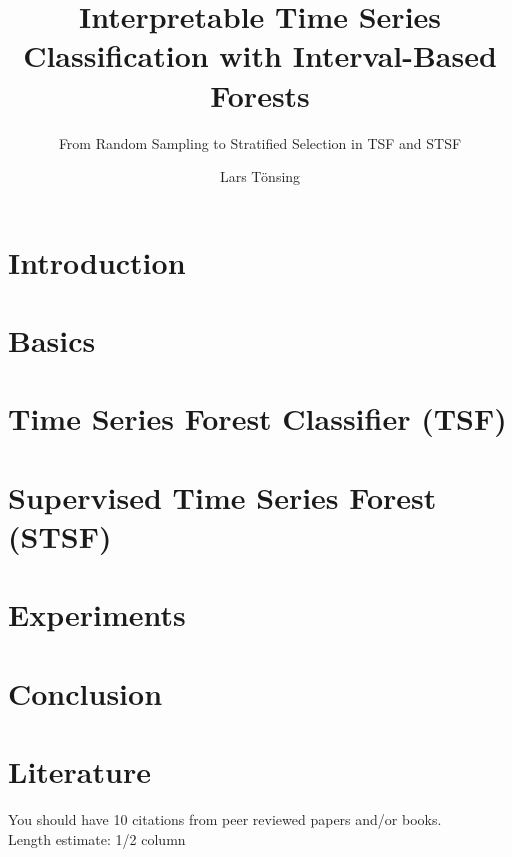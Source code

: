 \documentclass[sigconf,natbib=false]{acmart}
\begin{document}

\title{Interpretable Time Series Classification with Interval-Based Forests}
\subtitle{From Random Sampling to Stratified Selection in TSF and STSF}

\author{Lars Tönsing}


\begin{abstract}

\end{abstract}



\maketitle

\section{Introduction}


\section{Basics}


\section{Time Series Forest Classifier (TSF)}


\section{Supervised Time Series
Forest (STSF)}


\section{Experiments}

\section{Conclusion}


\section{Literature}
You should have 10 citations from peer reviewed papers and/or books. \\
Length estimate: 1/2 column
\end{document}
